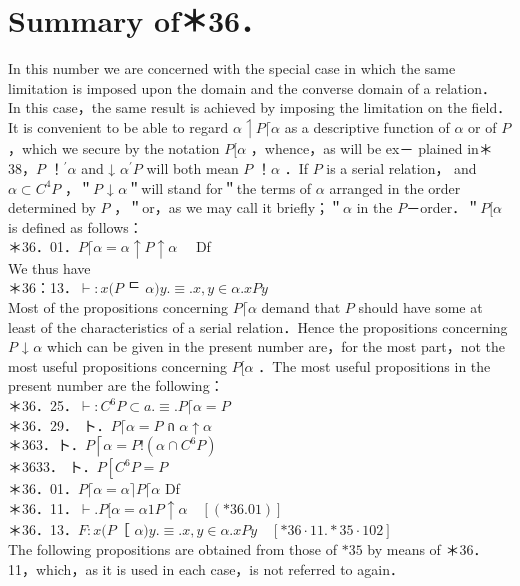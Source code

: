 \documentclass[10pt]{article}
\begin{document}
\section*{Summary of＊36．}
In this number we are concerned with the special case in which the same limitation is imposed upon the domain and the converse domain of a relation． In this case，the same result is achieved by imposing the limitation on the field．It is convenient to be able to regard $\alpha \upharpoonleft P\lceil\alpha$ as a descriptive function of $\alpha$ or of $P$ ，which we secure by the notation $P[\alpha$ ，whence，as will be ex－ plained in＊38，$P$ ！$^{\prime} \alpha$ and ↓ $\alpha^{\prime} P$ will both mean $P$ ！$\alpha$ ．If $P$ is a serial relation， and $\alpha \subset C^{4} P$ ，＂$P$ ↓ $\alpha$＂will stand for＂the terms of $\alpha$ arranged in the order determined by $P$ ，＂or，as we may call it briefly；＂$\alpha$ in the $P$－order．＂$P[\alpha$ is defined as follows：\\
＊36．01．$P\lceil\alpha=\alpha \uparrow P \uparrow \alpha \quad$ Df\\
We thus have\\
＊36：13．$\vdash: x(P$ ᄃ $\alpha) y . \equiv . x, y \in \alpha . x P y$\\
Most of the propositions concerning $P\lceil\alpha$ demand that $P$ should have some at least of the characteristics of a serial relation．Hence the propositions concerning $P$ ↓ $\alpha$ which can be given in the present number are，for the most part，not the most useful propositions concerning $P[\alpha$ ．The most useful propositions in the present number are the following：\\
＊36．25．$\vdash: C^{6} P \subset a . \equiv . P\lceil\alpha=P$\\
＊36．29． ト．$P\lceil\alpha=P$ ก $\alpha \uparrow \alpha$\\
＊363．ト．$P\left\lceil\alpha=P!\left(\alpha \cap C^{6} P\right)\right.$\\
＊3633． ト．$P\left[C^{6} P=P\right.$\\
＊36．01．$P\lceil\alpha=\alpha\rceil P\lceil\alpha$ Df\\
＊36．11．$\vdash . P[\alpha=\alpha 1 P \uparrow \alpha \quad[(* 36.01)]$\\
＊36．13．$F: x(P$［ $\alpha) y . \equiv . x, y \in \alpha . x P y \quad[* 36 \cdot 11 . * 35 \cdot 102]$\\
The following propositions are obtained from those of $* 35$ by means of ＊36．11，which，as it is used in each case，is not referred to again．\\
\end{document}
